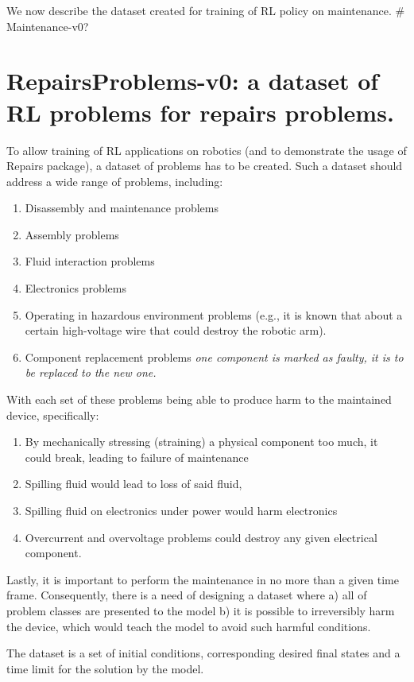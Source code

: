 \documentclass{article} %
\begin{document}
We now describe the dataset created for training of RL policy on maintenance. # Maintenance-v0?

\section{RepairsProblems-v0: a dataset of RL problems for repairs problems. }
\label{headings}
To allow training of RL applications on robotics (and to demonstrate the usage of Repairs package), a dataset of problems has to be created. Such a dataset should address a wide range of problems, including: 
\begin{enumerate}
    \item Disassembly and maintenance problems
    \item Assembly problems
    \item Fluid interaction problems
    \item Electronics problems
    \item Operating in hazardous environment problems (e.g., it is known that about a certain high-voltage wire that could destroy the robotic arm).
    \item Component replacement problems \textit{one component is marked as faulty, it is to be replaced to the new one.}
\end{enumerate}
With each set of these problems being able to produce harm to the maintained device, specifically:
\begin{enumerate}
    \item By mechanically stressing (straining) a physical component too much, it could break, leading to failure of maintenance
    \item Spilling fluid would lead to loss of said fluid,
    \item Spilling fluid on electronics under power would harm electronics
    \item Overcurrent and overvoltage problems could destroy any given electrical component.
\end{enumerate}
Lastly, it is important to perform the maintenance in no more than a given time frame.
Consequently, there is a need of designing a dataset where a) all of problem classes are presented to the model b) it is possible to irreversibly harm the device, which would teach the model to avoid such harmful conditions.

The dataset is a set of initial conditions, corresponding desired final states and a time limit for the solution by the model. 
\end{document}

